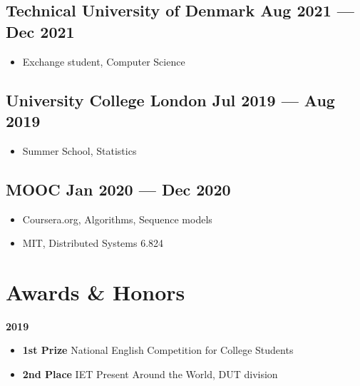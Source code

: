 \documentclass[a4,12pt]{article}
\newcommand{\subtext}[1]{
#1\par\vspace{-0.3cm}}
\newenvironment{zitemize}{
\begin{itemize}\itemsep0pt \parskip0pt \parsep1pt}
{\end{itemize}\vspace{-0.5cm}}
\begin{document}
\vspace{-0.1cm}
\subsection*{Technical University of Denmark \hfill \textbf{Aug 2021 --- Dec 2021}}
\begin{zitemize}
    \item
        \subtext{Exchange student, Computer Science}
        \vspace{0.15cm}
\end{zitemize}

\vspace{-0.1cm}
\subsection*{University College London \hfill \textbf{Jul 2019 --- Aug 2019}}
\begin{zitemize}
    \item
        \subtext{Summer School, Statistics}
        \vspace{0.15cm}
\end{zitemize}

\vspace{-0.1cm}
\subsection*{MOOC \hfill \textbf{Jan 2020 --- Dec 2020}}
\begin{zitemize}
    \item
        \subtext{Coursera.org, Algorithms, Sequence models }
        \vspace{0.25cm}
    \item
        \subtext{MIT, Distributed Systems 6.824}
        \vspace{0.15cm}
\end{zitemize}
\vspace{0cm}


\section{\textbf{Awards \& Honors}}
\vspace{-0.2cm}
\subtext{\textbf{2019}}
\begin{zitemize}
    \item \textbf{1st Prize} National English Competition for College Students
    \item \textbf{2nd Place} IET Present Around the World, DUT division
\end{zitemize}
\end{document}
